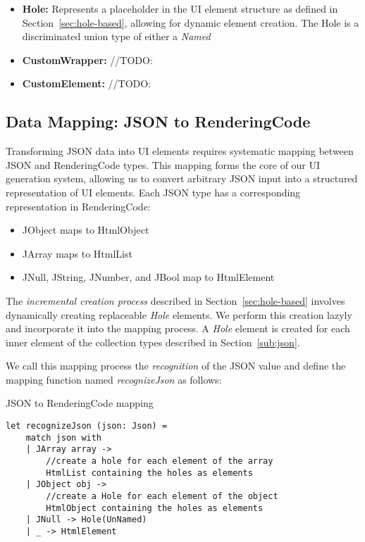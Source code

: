 \begin{itemize}
	\item {\textbf{Hole:} Represents a placeholder in the UI element structure as defined in Section~\ref{sec:hole-based}, allowing for dynamic element creation.
	      The Hole is a discriminated union type of either a \emph{Named}
	      }

	\item {\textbf{CustomWrapper:} //TODO:}

	\item{\textbf{CustomElement:} //TODO:}

\end{itemize}


\subsection{Data Mapping: JSON to RenderingCode}
\label{sec:mapping}
Transforming JSON data into UI elements requires systematic mapping between JSON and RenderingCode types.
This mapping forms the core of our UI generation system, allowing us to convert arbitrary JSON input into a structured representation of UI elements.
Each JSON type has a corresponding representation in RenderingCode:
\begin{itemize}
	\item JObject maps to HtmlObject
	\item JArray maps to HtmlList
	\item JNull, JString, JNumber, and JBool map to HtmlElement
\end{itemize}

The \emph{incremental creation process} described in Section~\ref{sec:hole-based} involves dynamically creating replaceable \emph{Hole} elements.
We perform this creation lazyly and incorporate it into the mapping process.
A \emph{Hole} element is created for each inner element of the collection types described in Section~\ref{sub:json}.


We call this mapping process the \emph{recognition} of the JSON value and define the mapping function named \emph{recognizeJson} as follows:

\begin{listing}[h]
	\caption {JSON to RenderingCode mapping}
	\begin{lstlisting}
let recognizeJson (json: Json) =
    match json with
    | JArray array -> 
        //create a hole for each element of the array
        HtmlList containing the holes as elements
    | JObject obj ->
        //create a Hole for each element of the object 
        HtmlObject containing the holes as elements
    | JNull -> Hole(UnNamed)
    | _ -> HtmlElement 
  \end{lstlisting}
\end{listing}

